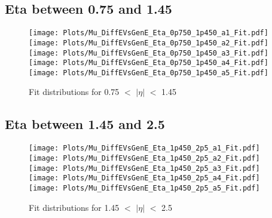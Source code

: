 \documentclass[a4paper,10pt]{article}
\begin{document}
 \subsection{Eta between 0.75 and 1.45}
 \begin{figure}[h!b] 
  \texttt{[image: Plots/Mu\_DiffEVsGenE\_Eta\_0p750\_1p450\_a1\_Fit.pdf]} 
  \texttt{[image: Plots/Mu\_DiffEVsGenE\_Eta\_0p750\_1p450\_a2\_Fit.pdf]} \\ 
  \texttt{[image: Plots/Mu\_DiffEVsGenE\_Eta\_0p750\_1p450\_a3\_Fit.pdf]} 
  \texttt{[image: Plots/Mu\_DiffEVsGenE\_Eta\_0p750\_1p450\_a4\_Fit.pdf]} \\ 
  \texttt{[image: Plots/Mu\_DiffEVsGenE\_Eta\_0p750\_1p450\_a5\_Fit.pdf]} 
 \caption{Fit distributions for 0.75 $<$ $\vert \eta \vert$ $<$ 1.45}
 \end{figure}
 \newpage 
 \subsection{Eta between 1.45 and 2.5}
 \begin{figure}[h!b] 
  \texttt{[image: Plots/Mu\_DiffEVsGenE\_Eta\_1p450\_2p5\_a1\_Fit.pdf]} 
  \texttt{[image: Plots/Mu\_DiffEVsGenE\_Eta\_1p450\_2p5\_a2\_Fit.pdf]} \\ 
  \texttt{[image: Plots/Mu\_DiffEVsGenE\_Eta\_1p450\_2p5\_a3\_Fit.pdf]} 
  \texttt{[image: Plots/Mu\_DiffEVsGenE\_Eta\_1p450\_2p5\_a4\_Fit.pdf]} \\ 
  \texttt{[image: Plots/Mu\_DiffEVsGenE\_Eta\_1p450\_2p5\_a5\_Fit.pdf]} 
 \caption{Fit distributions for 1.45 $<$ $\vert \eta \vert$ $<$ 2.5}
\end{figure} 
\end{document}
